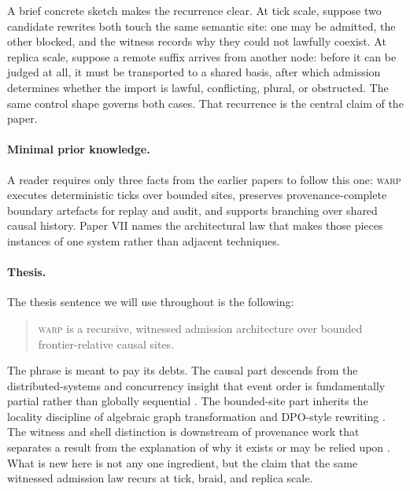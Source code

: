 \documentclass[11pt]{article}
\theoremstyle{definition}
\theoremstyle{plain}
\theoremstyle{remark}
\newcommand{\WARP}{\textsc{warp}}
\begin{document}
A brief concrete sketch makes the recurrence clear. At tick scale, suppose two candidate rewrites both touch the same semantic site: one may be admitted, the other blocked, and the witness records why they could not lawfully coexist. At replica scale, suppose a remote suffix arrives from another node: before it can be judged at all, it must be transported to a shared basis, after which admission determines whether the import is lawful, conflicting, plural, or obstructed. The same control shape governs both cases. That recurrence is the central claim of the paper.

\paragraph{Minimal prior knowledge.}
A reader requires only three facts from the earlier papers to follow this one: \WARP{} executes deterministic ticks over bounded sites, preserves provenance-complete boundary artefacts for replay and audit, and supports branching over shared causal history. Paper VII names the architectural law that makes those pieces instances of one system rather than adjacent techniques.

\paragraph{Thesis.}
The thesis sentence we will use throughout is the following:

\begin{quote}
\WARP{} is a recursive, witnessed admission architecture over bounded frontier-relative causal sites.
\end{quote}

The phrase is meant to pay its debts. The causal part descends from the distributed-systems and concurrency insight that event order is fundamentally partial rather than globally sequential \cite{lamport1978time,winskel1986event}. The bounded-site part inherits the locality discipline of algebraic graph transformation and DPO-style rewriting \cite{ehrig1973graph,corradini1997algebraic}. The witness and shell distinction is downstream of provenance work that separates a result from the explanation of why it exists or may be relied upon \cite{buneman2001why,green2007provenance,cheney2009provenance}. What is new here is not any one ingredient, but the claim that the same witnessed admission law recurs at tick, braid, and replica scale.
\end{document}

